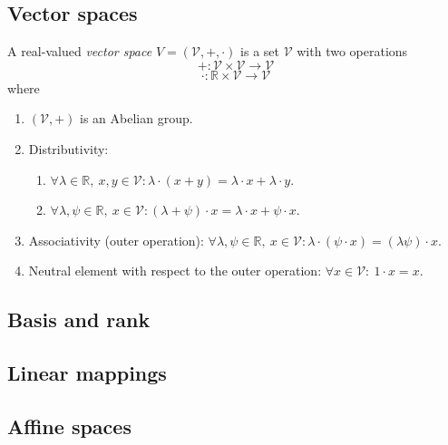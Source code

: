 \subsection{Vector spaces}
\begin{definition}
A real-valued \emph{vector space} \( V = (\mathcal{V}, +, \cdot) \) is a set \(\mathcal{V}\) with two operations
\[
+ : \mathcal{V} \times \mathcal{V} \to \mathcal{V}
\tag{2.62}
\]
\[
\cdot : \mathbb{R} \times \mathcal{V} \to \mathcal{V}
\tag{2.63}
\]
where
\begin{enumerate}
    \item \((\mathcal{V}, +)\) is an Abelian group.
    \item Distributivity:
    \begin{enumerate}
        \item \(\forall \lambda \in \mathbb{R},\ x,y \in \mathcal{V}: 
        \lambda \cdot (x + y) = \lambda \cdot x + \lambda \cdot y\).
        \item \(\forall \lambda, \psi \in \mathbb{R},\ x \in \mathcal{V}:
        (\lambda + \psi) \cdot x = \lambda \cdot x + \psi \cdot x\).
    \end{enumerate}
    \item Associativity (outer operation): 
    \(\forall \lambda, \psi \in \mathbb{R},\ x \in \mathcal{V}:
    \lambda \cdot (\psi \cdot x) = (\lambda \psi) \cdot x\).
    \item Neutral element with respect to the outer operation:
    \(\forall x \in \mathcal{V}:\ 1 \cdot x = x\).
\end{enumerate}
\end{definition}

\subsection{Basis and rank}

\subsection{Linear mappings}

\subsection{Affine spaces}

